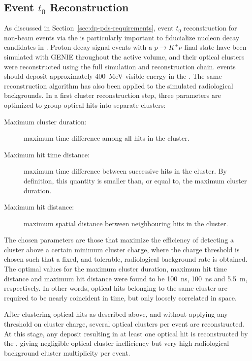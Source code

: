 
\subsection{Event $t_{0}$ Reconstruction}
\label{subsec:dp-pds-performance_t0}

As discussed in Section~\ref{sec:dp-pds-requirements}, event $t_0$ reconstruction for non-beam events via the  is particularly important to fiducialize nucleon decay candidates in . Proton decay signal events with a %
$p\rightarrow K^{+} \bar\nu$ final state have been simulated with GENIE \cite{Andreopoulos:2009rq} throughout the   active volume, and their optical clusters were reconstructed using the full simulation and reconstruction chain.  events should deposit approximately \SI{400}{\MeV} visible energy in the \lar. The same reconstruction algorithm has also been applied to the simulated radiological backgrounds. In a first cluster reconstruction step, three parameters are optimized to group optical hits into separate clusters:
%
\begin{description}
\item[Maximum cluster duration:] maximum time difference among all  hits in the cluster.
\item[Maximum hit time distance:] maximum time difference between successive  hits in the cluster. By definition, this quantity is smaller than, or equal to, the maximum cluster duration.
\item[Maximum hit distance:] maximum spatial distance between neighbouring  hits in the cluster. 
\end{description}

The chosen parameters are those that maximize the efficiency of detecting a  cluster above a certain minimum cluster charge, where the charge threshold is chosen such that a fixed, and tolerable, radiological background rate is obtained. The optimal values for the maximum cluster duration, maximum hit time distance and maximum hit distance were found to be \SI{100}{\ns}, \SI{100}{\ns} and \SI{5.5}{\m}, respectively. In other words, optical hits belonging to the same cluster are required to be nearly coincident in time, but only loosely correlated in space.

After clustering optical hits as described above, and without applying any threshold on cluster charge, several optical clusters per event are reconstructed. At this stage, any deposit resulting in at least one optical hit is reconstructed by the , giving negligible  optical cluster inefficiency but very high radiological background cluster multiplicity per event. 

